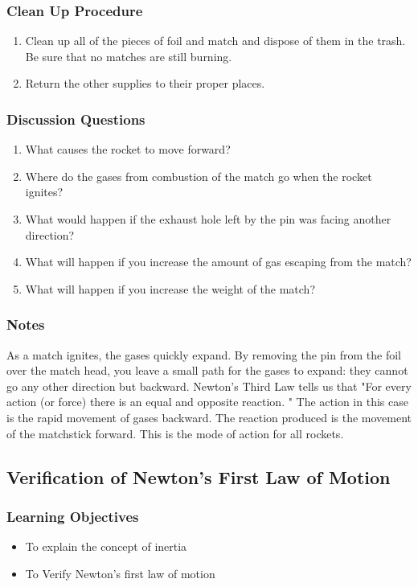 \subsubsection*{Clean Up Procedure}
\begin{enumerate}
\item{Clean up all of the pieces of foil and match and dispose of them in the trash. Be sure that no matches are still burning.} 
\item{Return the other supplies to their proper places.} 
\end{enumerate}

\subsubsection*{Discussion Questions}
\begin{enumerate}
\item{What causes the rocket to move forward?}
\item{Where do the gases from combustion of the match go when the rocket ignites?}
\item{What would happen if the exhaust hole left by the pin was facing another direction?}
\item{What will happen if you increase the amount of gas escaping from the match?}
\item{What will happen if you increase the weight of the match?}
\end{enumerate}

\subsubsection*{Notes}
As a match ignites, the gases quickly expand. By removing the pin from the foil over the match head, you leave a small path for the gases to expand: they cannot go any other direction but backward. Newton's Third Law tells us that "For every action (or force) there is an equal and opposite reaction.  " The action in this case is the rapid movement of gases backward. The reaction produced is the movement of the matchstick forward. This is the mode of action for all rockets.  

\subsection{Verification of Newton's First Law of Motion}

\subsubsection*{Learning Objectives}
\begin{itemize}
\item{To explain the concept of inertia} 
\item{To Verify Newton's first law of motion} 
\end{itemize}


